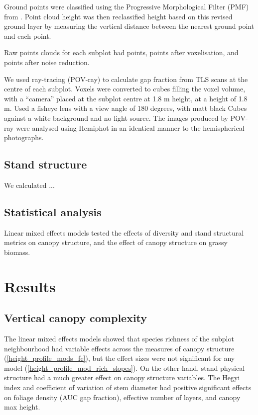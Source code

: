 \documentclass[11pt,a4paper]{article}
\newcommand{\textapprox}{\raisebox{0.5ex}{\texttildelow}}  %
\begin{document}
Ground points were classified using the Progressive Morphological Filter (PMF) from \citet{Zhang2003}. Point cloud height was then reclassified height based on this revised ground layer by measuring the vertical distance between the nearest ground point and each point.

Raw points clouds for each subplot had \textapprox{}\rawpt{} points, \textapprox{}\voxelpt{} points after voxelisation, and \textapprox{}\subpt{} points after noise reduction.

We used ray-tracing (POV-ray) to calculate gap fraction from TLS scans at the centre of each subplot. Voxels were converted to cubes filling the voxel volume, with a ``camera'' placed at the subplot centre at 1.8 m height, at a height of 1.8 m. Used a fisheye lens with a view angle of 180 degrees, with matt black Cubes against a white background and no light source. The images produced by POV-ray were analysed using Hemiphot in an identical manner to the hemispherical photographs.

\subsection{Stand structure}

We calculated ...

\subsection{Statistical analysis}

Linear mixed effects models tested the effects of diversity and stand structural metrics on canopy structure, and the effect of canopy structure on grassy biomass.


\section{Results}

\subsection{Vertical canopy complexity}

The linear mixed effects models showed that species richness of the subplot neighbourhood had variable effects across the measures of canopy structure (\autoref{height_profile_mods_fe}), but the effect sizes were not significant for any model (\autoref{height_profile_mod_rich_slopes}). On the other hand, stand physical structure had a much greater effect on canopy structure variables. The Hegyi index and coefficient of variation of stem diameter had positive significant effects on foliage density (AUC gap fraction), effective number of layers, and canopy max height.
\end{document}
